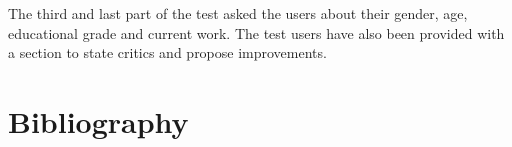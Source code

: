 \documentclass[final,twoside,11pt,titlepage,a4paper,english,bibliography=totocnumbered,listof=numbered]{scrbook}
\begin{document}
\begin{appendix}
The third and last part of the test asked the users about their gender, age, educational grade and current work. The test users have also been provided with a section to state critics and propose improvements.
\newpage
\setwidesite{}
\chapter{Bibliography}
\label{cha:bibliography}
\printbibliography[heading=offline,filter=offline]
\printbibliography[heading=online,filter=online]






%

% 


\end{appendix}

\backmatter
\end{document}
